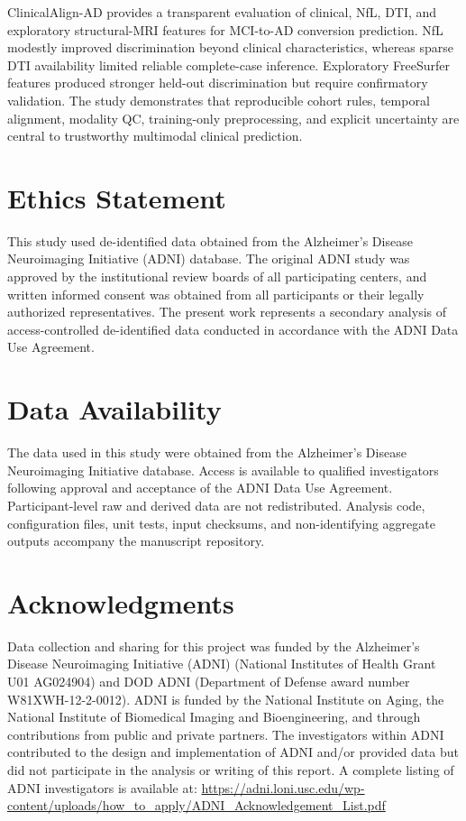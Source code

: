 \documentclass[preprint,12pt]{elsarticle}
\begin{document}
ClinicalAlign-AD provides a transparent evaluation of clinical, NfL, DTI, and exploratory structural-MRI features for MCI-to-AD conversion prediction. NfL modestly improved discrimination beyond clinical characteristics, whereas sparse DTI availability limited reliable complete-case inference. Exploratory FreeSurfer features produced stronger held-out discrimination but require confirmatory validation. The study demonstrates that reproducible cohort rules, temporal alignment, modality QC, training-only preprocessing, and explicit uncertainty are central to trustworthy multimodal clinical prediction.

\section*{Ethics Statement}

This study used de-identified data obtained from the Alzheimer's Disease Neuroimaging Initiative (ADNI) database. The original ADNI study was approved by the institutional review boards of all participating centers, and written informed consent was obtained from all participants or their legally authorized representatives. The present work represents a secondary analysis of access-controlled de-identified data conducted in accordance with the ADNI Data Use Agreement.

\section*{Data Availability}

The data used in this study were obtained from the Alzheimer's Disease Neuroimaging Initiative database. Access is available to qualified investigators following approval and acceptance of the ADNI Data Use Agreement. Participant-level raw and derived data are not redistributed. Analysis code, configuration files, unit tests, input checksums, and non-identifying aggregate outputs accompany the manuscript repository.

\section*{Acknowledgments}

Data collection and sharing for this project was funded by the Alzheimer's Disease Neuroimaging Initiative (ADNI) (National Institutes of Health Grant U01 AG024904) and DOD ADNI (Department of Defense award number W81XWH-12-2-0012). ADNI is funded by the National Institute on Aging, the National Institute of Biomedical Imaging and Bioengineering, and through contributions from public and private partners. The investigators within ADNI contributed to the design and implementation of ADNI and/or provided data but did not participate in the analysis or writing of this report. A complete listing of ADNI investigators is available at:
\url{https://adni.loni.usc.edu/wp-content/uploads/how_to_apply/ADNI_Acknowledgement_List.pdf}



\end{document}
